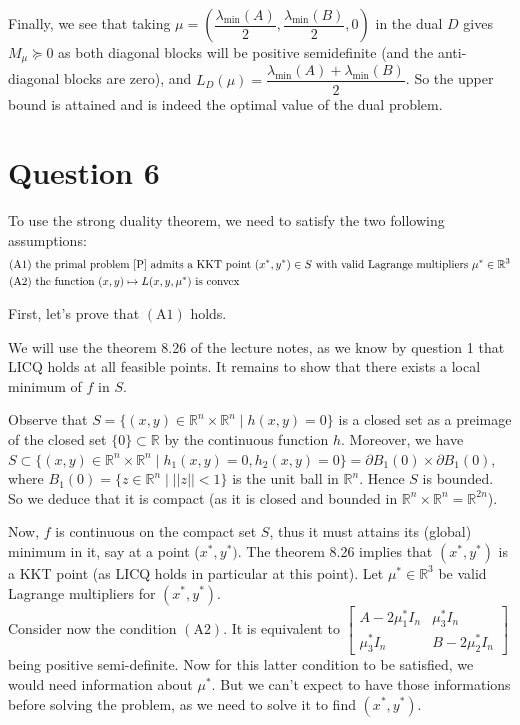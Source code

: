 \documentclass{article}
\newcommand{\R}{\mathbb{R}}
\begin{document}
Finally, we see that taking $\mu=\left(\dfrac{\lambda_{\min} (A)}{2}, \dfrac{\lambda_{\min} (B)}{2}, 0\right)$ in the dual $D$ gives $M_{\mu}\succeq 0$ as both diagonal blocks will be positive semidefinite (and the anti-diagonal blocks are zero), and $L_D(\mu)=\dfrac{\lambda_{\min} (A)+\lambda_{\min} (B)}{2}$. So the upper bound is attained and is indeed the optimal value of the dual problem.


\section*{Question 6}
To use the strong duality theorem, we need to satisfy the two following assumptions:
\begin{align*}
(\text{A}1) &  \text{ the primal problem \eqref{P} admits a KKT point } (x^*,y^*)\in S \text{ with valid Lagrange multipliers } \mu^*\in \R^3 \\
(\text{A}2) &  \text{ the function } (x,y)\mapsto L(x,y,\mu^*) \text{ is convex}
\end{align*}

\noindent First, let's prove that $(\text{A}1)$ holds.

We will use the theorem 8.26 of the lecture notes, as we know by question 1 that LICQ holds at all feasible points. It remains to show that there exists a local minimum of $f$ in $S$.
 
Observe that $S=\{(x,y)\in\R^n\times\R^n \mid h(x,y)=0\}$ is a closed set as a preimage of the closed set $\{0\}\subset \R$ by the continuous function $h$. Moreover, we have $S\subset \{(x, y)\in\R^n\times\R^n \mid h_1(x,y)=0, h_2(x,y)=0\} = \partial B_1(0)\times \partial B_1(0)$, where $B_1(0)=\{z\in\R^n\mid ||z||<1\}$ is the unit ball in $\R^n$. Hence $S$ is bounded. So we deduce that it is compact (as it is closed and bounded in $\R^n\times\R^n=\R^{2n}$).
 
 Now, $f$ is continuous on the compact set $S$, thus it must attains its (global) minimum in it, say at a point ($x^*,y^*)$. The theorem 8.26 implies that $(x^*,y^*)$ is a KKT point (as LICQ holds in particular at this point).
 Let $\mu^*\in\R^3$ be valid Lagrange multipliers for $(x^*,y^*)$.\\
 
\noindent Consider now the condition $(\text{A}2)$. It is equivalent to $\begin{bmatrix} A-2\mu^*_1 I_n & \mu^*_3 I_n \\
\mu^*_3 I_n & B-2\mu^*_2 I_n \end{bmatrix}$ being positive semi-definite. Now for this latter condition to be satisfied, we would need information about $\mu^*$. But we can't expect to have those informations before solving the problem, as we need to solve it to find $(x^*,y^*)$.
 
\end{document}
